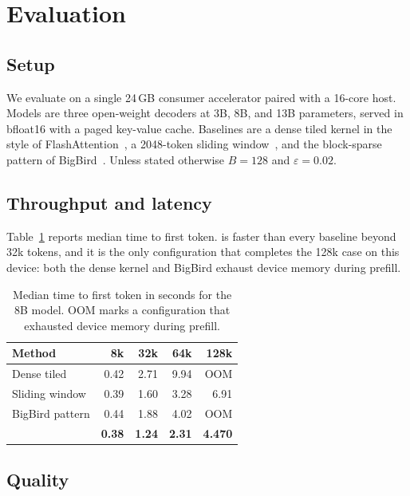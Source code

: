 \section{Evaluation}
\label{sec:evaluation}

\subsection{Setup}

We evaluate on a single 24\,GB consumer accelerator paired with a 16-core host.
Models are three open-weight decoders at 3B, 8B, and 13B parameters, served in
bfloat16 with a paged key-value cache. Baselines are a dense tiled kernel in
the style of FlashAttention~\cite{dao2022flashattention}, a 2048-token sliding
window~\cite{beltagy2020longformer}, and the block-sparse pattern of
BigBird~\cite{zaheer2020bigbird}. Unless stated otherwise $B = 128$ and
$\varepsilon = 0.02$.

\subsection{Throughput and latency}

Table~\ref{tab:latency} reports median time to first token. \sysname{} is
faster than every baseline beyond 32k tokens, and it is the only configuration
that completes the 128k case on this device: both the dense kernel and BigBird
exhaust device memory during prefill.

\begin{table}[t]
  \centering
  \small
  \caption{Median time to first token in seconds for the 8B model. OOM marks a
  configuration that exhausted device memory during prefill.}
  \label{tab:latency}
  \begin{tabular}{lrrrr}
    \toprule
    Method & 8k & 32k & 64k & 128k \\
    \midrule
    Dense tiled       & 0.42 & 2.71 & 9.94 & OOM \\
    Sliding window    & 0.39 & 1.60 & 3.28 & 6.91 \\
    BigBird pattern   & 0.44 & 1.88 & 4.02 & OOM \\
    \sysname{}        & \textbf{0.38} & \textbf{1.24} & \textbf{2.31} & \textbf{4.470} \\
    \bottomrule
  \end{tabular}
\end{table}

\subsection{Quality}

